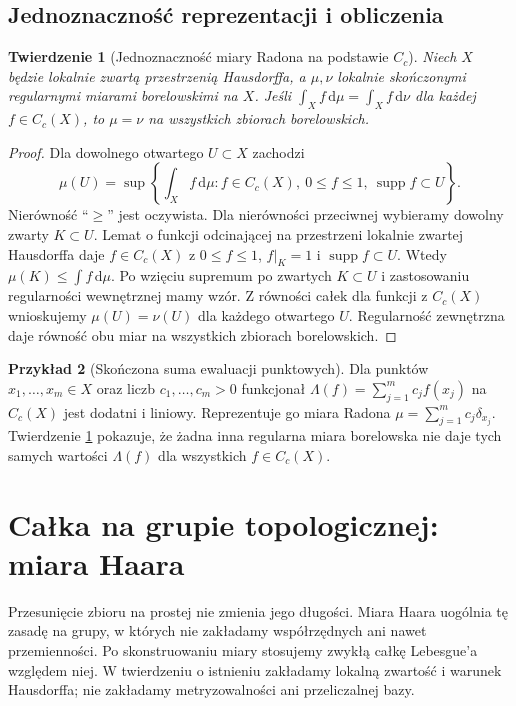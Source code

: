 \documentclass[11pt,a4paper]{article}
\numberwithin{equation}{section}
\theoremstyle{plain}
\newtheorem{twierdzenie}{Twierdzenie}[section]
\theoremstyle{definition}
\newtheorem{przyklad}[twierdzenie]{Przykład}
\theoremstyle{remark}
\newcommand{\supp}{\operatorname{supp}}
\begin{document}
\subsection*{Jednoznaczność reprezentacji i obliczenia}
\begin{twierdzenie}[Jednoznaczność miary Radona na podstawie $C_c$]\label{tw:radon-unikalnosc}
Niech $X$ będzie lokalnie zwartą przestrzenią Hausdorffa, a $\mu,\nu$ lokalnie skończonymi regularnymi miarami borelowskimi na $X$. Jeśli
$\int_X f\,\mathrm d\mu=\int_Xf\,\mathrm d\nu$ dla każdej $f\in C_c(X)$, to $\mu=\nu$ na wszystkich zbiorach borelowskich.
\end{twierdzenie}
\begin{proof}
Dla dowolnego otwartego $U\subset X$ zachodzi
\[
\mu(U)=\sup\left\{\int_X f\,\mathrm d\mu: f\in C_c(X),\ 0\le f\le1,\ \supp f\subset U\right\}.
\]
Nierówność ``$\ge$'' jest oczywista. Dla nierówności przeciwnej wybieramy dowolny zwarty $K\subset U$. Lemat o funkcji odcinającej na przestrzeni lokalnie zwartej Hausdorffa daje $f\in C_c(X)$ z $0\le f\le1$, $f|_K=1$ i $\supp f\subset U$. Wtedy $\mu(K)\le\int f\,\mathrm d\mu$. Po wzięciu supremum po zwartych $K\subset U$ i zastosowaniu regularności wewnętrznej mamy wzór. Z równości całek dla funkcji z $C_c(X)$ wnioskujemy $\mu(U)=\nu(U)$ dla każdego otwartego $U$. Regularność zewnętrzna daje równość obu miar na wszystkich zbiorach borelowskich.
\end{proof}
\begin{przyklad}[Skończona suma ewaluacji punktowych]
Dla punktów $x_1,\dots,x_m\in X$ oraz liczb $c_1,\dots,c_m>0$ funkcjonał $\Lambda(f)=\sum_{j=1}^m c_jf(x_j)$ na $C_c(X)$ jest dodatni i liniowy. Reprezentuje go miara Radona $\mu=\sum_{j=1}^m c_j\delta_{x_j}$. Twierdzenie \ref{tw:radon-unikalnosc} pokazuje, że żadna inna regularna miara borelowska nie daje tych samych wartości $\Lambda(f)$ dla wszystkich $f\in C_c(X)$.
\end{przyklad}

\section{Całka na grupie topologicznej: miara Haara}
Przesunięcie zbioru na prostej nie zmienia jego długości. Miara Haara uogólnia tę zasadę na grupy, w których nie zakładamy współrzędnych ani nawet przemienności. Po skonstruowaniu miary stosujemy zwykłą całkę Lebesgue'a względem niej. W twierdzeniu o istnieniu zakładamy lokalną zwartość i warunek Hausdorffa; nie zakładamy metryzowalności ani przeliczalnej bazy.
\end{document}
